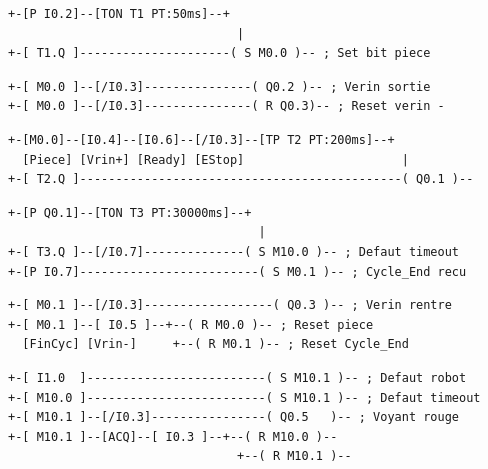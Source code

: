 \documentclass[12pt, a4paper]{report}
\begin{document}
\begin{lstlisting}[style=ladder,
  caption={Reseau 2 : Detection piece avec anti-rebond 50 ms}]
+-[P I0.2]--[TON T1 PT:50ms]--+
                                |
+-[ T1.Q ]---------------------( S M0.0 )-- ; Set bit piece
\end{lstlisting}

\begin{lstlisting}[style=ladder,
  caption={Reseau 3 : Commande verin de blocage}]
+-[ M0.0 ]--[/I0.3]---------------( Q0.2 )-- ; Verin sortie
+-[ M0.0 ]--[/I0.3]---------------( R Q0.3)-- ; Reset verin -
\end{lstlisting}

\begin{lstlisting}[style=ladder,
  caption={Reseau 4 : Start Robot (impulsion TP 200 ms)}]
+-[M0.0]--[I0.4]--[I0.6]--[/I0.3]--[TP T2 PT:200ms]--+
  [Piece] [Vrin+] [Ready] [EStop]                      |
+-[ T2.Q ]---------------------------------------------( Q0.1 )--
\end{lstlisting}

\begin{lstlisting}[style=ladder,
  caption={Reseau 5 : Timeout 30 s sur reponse robot}]
+-[P Q0.1]--[TON T3 PT:30000ms]--+
                                   |
+-[ T3.Q ]--[/I0.7]--------------( S M10.0 )-- ; Defaut timeout
+-[P I0.7]-------------------------( S M0.1 )-- ; Cycle_End recu
\end{lstlisting}

\begin{lstlisting}[style=ladder,
  caption={Reseau 6 : Liberation verin et redemarrage}]
+-[ M0.1 ]--[/I0.3]------------------( Q0.3 )-- ; Verin rentre
+-[ M0.1 ]--[ I0.5 ]--+--( R M0.0 )-- ; Reset piece
  [FinCyc] [Vrin-]     +--( R M0.1 )-- ; Reset Cycle_End
\end{lstlisting}

\begin{lstlisting}[style=ladder,
  caption={Reseau 7 : Gestion defauts et voyant rouge}]
+-[ I1.0  ]-------------------------( S M10.1 )-- ; Defaut robot
+-[ M10.0 ]-------------------------( S M10.1 )-- ; Defaut timeout
+-[ M10.1 ]--[/I0.3]----------------( Q0.5   )-- ; Voyant rouge
+-[ M10.1 ]--[ACQ]--[ I0.3 ]--+--( R M10.0 )--
                                +--( R M10.1 )--
\end{lstlisting}

\end{document}
